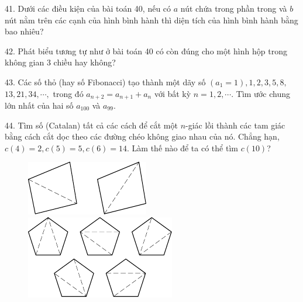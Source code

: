 \begin{problem}{41.}
	Dưới các điều kiện của bài toán 40, nếu có $a$ nút chứa trong phần trong và $b$ nút nằm trên các cạnh của hình bình hành thì diện tích của hình bình hành bằng bao nhiêu?
\end{problem}

\begin{problem}{42.}
	Phát biểu tương tự như ở bài toán 40 có còn đúng cho một hình hộp trong không gian 3 chiều hay không?
\end{problem}


\begin{problem}{43.}
	Các số thỏ (hay số Fibonacci) tạo thành một dãy số  $(a_1=1),1,2,3,5,8,$ $13,21,34,\cdots,$ trong đó $a_{n+2}=a_{n+1}+a_n$ với bất kỳ $n=1,2,\cdots$. Tìm ước chung lớn nhất của hai số $a_{100}$  và  $a_{99}$.
\end{problem}

\begin{problem}{44.}
	Tìm số (Catalan) tất cả các cách để cắt một $n$-giác lồi thành các tam giác bằng cách cắt dọc theo các đường chéo không giao nhau của nó. Chẳng hạn, $c(4)=2, c(5)=5, c(6)=14$. Làm thế nào để ta có thể tìm $c(10)$?
	\begin{figure}
		\includegraphics{taskbook-281}
		\qquad
		\includegraphics{taskbook-282}
	\end{figure}
\end{problem}

